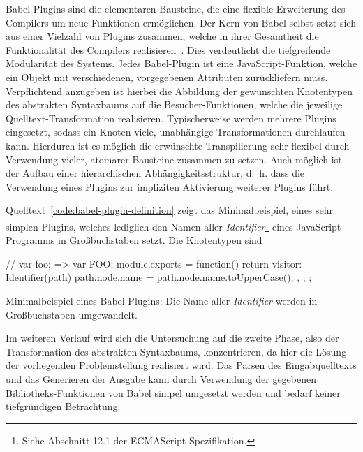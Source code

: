 Babel-Plugins sind die elementaren Bausteine, die eine flexible Erweiterung des Compilers um neue Funktionen ermöglichen. Der Kern von Babel selbst setzt sich aus einer Vielzahl von Plugins zusammen, welche in ihrer Gesamtheit die Funktionalität des Compilers realisieren~\autocite{BABEL}. Dies verdeutlicht die tiefgreifende Modularität des Systems. Jedes Babel-Plugin ist eine JavaScript-Funktion, welche ein Objekt mit verschiedenen, vorgegebenen Attributen zurückliefern muss. Verpflichtend anzugeben ist hierbei die Abbildung der gewünschten Knotentypen des abstrakten Syntaxbaums auf die Besucher-Funktionen, welche die jeweilige Quelltext-Transformation realisieren. Typischerweise werden mehrere Plugins eingesetzt, sodass ein Knoten viele, unabhängige Transformationen durchlaufen kann. Hierdurch ist es möglich die erwünschte Transpilierung sehr flexibel durch Verwendung vieler, atomarer Bausteine zusammen zu setzen. Auch möglich ist der Aufbau einer hierarchischen Abhängigkeitsstruktur, d.~h. dass die Verwendung eines Plugins zur impliziten Aktivierung weiterer Plugins führt.

Quelltext~\ref{code:babel-plugin-definition} zeigt das Minimalbeispiel, eines sehr simplen Plugins, welches lediglich den Namen aller \textit{Identifier}\footnote{Siehe Abschnitt 12.1 der ECMAScript-Spezifikation\autocite[187\psqq]{ECMASCRIPT:2019}.} eines JavaScript-Programms in Großbuchstaben setzt. Die Knotentypen sind

\bigskip
\begin{listing}[htb]
\begin{jscode}
// var foo; => var FOO;
module.exports = function() {
  return {
    visitor: {
      Identifier(path) {
        path.node.name = path.node.name.toUpperCase();
      },
    }
  };
};
\end{jscode}
\caption[Minimalbeispiel eines Babel-Plugins]{Minimalbeispiel eines Babel-Plugins: Die Name aller \textit{Identifier} werden in Großbuchstaben umgewandelt.}
\label{code:babel-plugin-definition}
\end{listing}

Im weiteren Verlauf wird sich die Untersuchung auf die zweite Phase, also der Transformation des abstrakten Syntaxbaums, konzentrieren, da hier die Lösung der vorliegenden Problemstellung realisiert wird. Das Parsen des Eingabquelltexts und das Generieren der Ausgabe kann durch Verwendung der gegebenen Bibliotheks-Funktionen von Babel simpel umgesetzt werden und bedarf keiner tiefgründigen Betrachtung.
